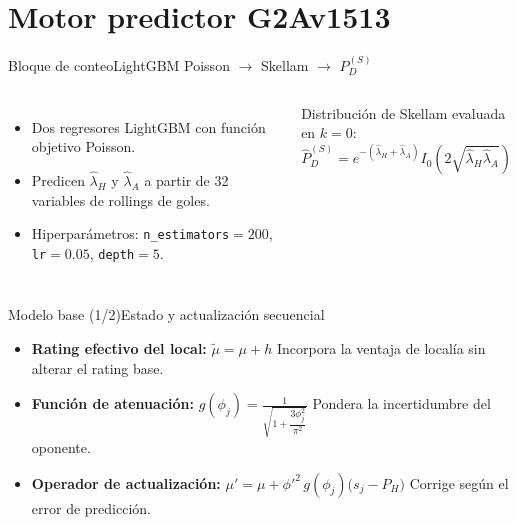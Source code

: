 \documentclass[aspectratio=169,11pt]{beamer}
\begin{document}
\section{Motor predictor G2Av1513}

\begin{frame}{Bloque de conteo}{LightGBM Poisson $\to$ Skellam $\to$ $P_D^{(S)}$}
	\vspace*{-0.6cm}
	\begin{columns}[T,onlytextwidth]
		\par\vskip 1mm
		\footnotesize
		\begin{itemize}
			\item Dos regresores LightGBM con funci\'on objetivo Poisson\supercite{ke2017lightgbm}.
			\item Predicen $\hat{\lambda}_H$ y $\hat{\lambda}_A$ a partir de 32 variables de rollings de goles.
			\item Hiperpar\'ametros: \texttt{n\_estimators}$=200$, \texttt{lr}$=0{.}05$, \texttt{depth}$=5$.
		\end{itemize}
		\par\vskip 1mm
		\footnotesize
		Distribuci\'on de Skellam\supercite{skellam1946,karlis2003} evaluada en $k=0$:
		\[
		\hat{P}_D^{(S)} = e^{-(\hat{\lambda}_H + \hat{\lambda}_A)} I_0\!\left(2\sqrt{\hat{\lambda}_H \hat{\lambda}_A}\right) 
		\]
	\end{columns}
	\vskip 0.3mm
\end{frame}

\begin{frame}{Modelo base (1/2)}{Estado y actualizaci\'on secuencial}
	\vspace*{-0.7cm}
	\small
	\begin{itemize}
		\item \textbf{Rating efectivo del local:} $\tilde{\mu} = \mu + h$
		{\footnotesize Incorpora la ventaja de local\'ia sin alterar el rating base.}
		\vskip 0.5mm
		
		\item \textbf{Funci\'on de atenuaci\'on:} $g(\phi_j) = \frac{1}{\sqrt{1 + \dfrac{3\phi_j^2}{\pi^2}}}$
		{\footnotesize Pondera la incertidumbre del oponente.\supercite{Glickman2022}}
		\vskip 0.5mm
		
		\item \textbf{Operador de actualizaci\'on:} $\mu' = \mu + \phi'^2 \, g(\phi_j)\bigl(s_j - P_H\bigr)$
		{\footnotesize Corrige seg\'un el error de predicci\'on.}
	\end{itemize}
\end{frame}
\end{document}
